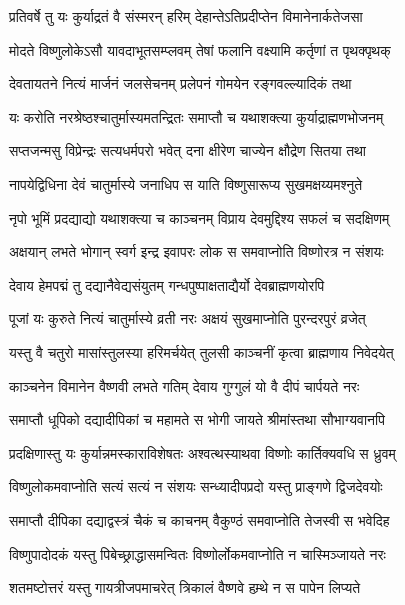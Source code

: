 \twolineshloka
{प्रतिवर्षे तु यः कुर्याद्रतं वै संस्मरन् हरिम्}
{देहान्तेऽतिप्रदीप्तेन विमानेनार्कतेजसा} %

\twolineshloka
{मोदते विष्णुलोकेऽसौ यावदाभूतसम्प्लवम्}
{तेषां फलानि वक्ष्यामि कर्तृणां त पृथक्पृथक्} %

\twolineshloka
{देवतायतने नित्यं मार्जनं जलसेचनम्}
{प्रलेपनं गोमयेन रङ्गवल्ल्यादिकं तथा} %

\twolineshloka
{यः करोति नरश्रेष्ठश्चातुर्मास्यमतन्द्रितः}
{समाप्तौ च यथाशक्त्या कुर्याद्राह्मणभोजनम्} %

\twolineshloka
{सप्तजन्मसु विप्रेन्द्रः सत्यधर्मपरो भवेत्}
{दना क्षीरेण चाज्येन क्षौद्रेण सितया तथा} %

\twolineshloka
{नापयेद्विधिना देवं चातुर्मास्ये जनाधिप}
{स याति विष्णुसारूप्य सुखमक्षय्यमश्नुते} %

\twolineshloka
{नृपो भूमिं प्रदद्याद्यो यथाशक्त्या च काञ्चनम्}
{विप्राय देवमुद्दिश्य सफलं च सदक्षिणम्} %

\twolineshloka
{अक्षयान् लभते भोगान् स्वर्ग इन्द्र इवापरः}
{लोक स समवाप्नोति विष्णोरत्र न संशयः} %

\twolineshloka
{देवाय हेमपद्मं तु दद्यानैवेद्यसंयुतम्}
{गन्धपुष्पाक्षताद्यैर्यो देवब्राह्मणयोरपि} %

\twolineshloka
{पूजां यः कुरुते नित्यं चातुर्मास्ये व्रती नरः}
{अक्षयं सुखमाप्नोति पुरन्दरपुरं व्रजेत्} %

\twolineshloka
{यस्तु वै चतुरो मासांस्तुलस्या हरिमर्चयेत्}
{तुलसी काञ्चनीं कृत्वा ब्राह्मणाय निवेदयेत्} %

\twolineshloka
{काञ्चनेन विमानेन वैष्णवी लभते गतिम्}
{देवाय गुग्गुलं यो वै दीपं चार्पयते नरः} %

\twolineshloka
{समाप्तौ धूपिको दद्यादीपिकां च महामते}
{स भोगी जायते श्रीमांस्तथा सौभाग्यवानपि} %

\twolineshloka
{प्रदक्षिणास्तु यः कुर्यान्नमस्काराविशेषतः}
{अश्वत्थस्याथवा विष्णोः कार्तिक्यवधि स ध्रुवम्} %

\twolineshloka
{विष्णुलोकमवाप्नोति सत्यं सत्यं न संशयः}
{सन्ध्यादीपप्रदो यस्तु प्राङ्गणे द्विजदेवयोः} %

\twolineshloka
{समाप्तौ दीपिका दद्याद्वस्त्रं चैकं च काचनम्}
{वैकुण्ठं समवाप्नोति तेजस्वी स भवेदिह} %

\twolineshloka
{विष्णुपादोदकं यस्तु पिबेच्छ्राद्धासमन्वितः}
{विष्णोर्लोकमवाप्नोति न चास्मिञ्जायते नरः} %

\twolineshloka
{शतमष्टोत्तरं यस्तु गायत्रीजपमाचरेत्}
{त्रिकालं वैष्णवे हम्र्थे न स पापेन लिप्यते} %

